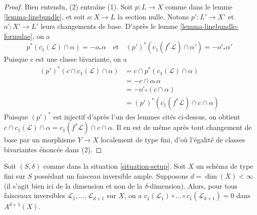 \begin{proof}
Bien entendu, (2) entraîne (1).
Soit $p : L \to X$ comme dans le lemme \ref{lemma-linebundle}, et soit $o : X \to L$
la section nulle. Notons $p' : L' \to X'$ et $o' : X' \to L'$
leurs changements de base. D'après le lemme \ref{lemma-linebundle-formulae}, on a
$$
p^*(c_1(\mathcal{L}) \cap \alpha) = - o_* \alpha
\quad\text{et}\quad
(p')^*(c_1(f^*\mathcal{L}) \cap \alpha') = - o'_* \alpha'
$$
Puisque $c$ est une classe bivariante, on a
\begin{align*}
(p')^*(c \cap c_1(\mathcal{L}) \cap \alpha)
& =
c \cap p^*(c_1(\mathcal{L}) \cap \alpha) \\
& =
- c \cap o_* \alpha \\
& =
- o'_*(c \cap \alpha) \\
& =
(p')^*(c_1(f^*\mathcal{L}) \cap c \cap \alpha)
\end{align*}
Puisque $(p')^*$ est injectif d'après l'un des lemmes cités ci-dessus, on obtient
$c \cap c_1(\mathcal{L}) \cap \alpha =
c_1(f^*\mathcal{L}) \cap c \cap \alpha$.
Il en est de même après tout changement de base par un morphisme $Y \to X$ localement de type fini,
d'où l'égalité de classes bivariantes énoncée dans (2).
\end{proof}

\begin{lemma}
\label{lemma-vanish-above-dimension}
Soit $(S, \delta)$ comme dans la situation \ref{situation-setup}. Soit $X$ un
schéma de type fini sur $S$ possédant un faisceau inversible ample.
Supposons $d = \dim(X) < \infty$ (il s'agit bien ici de la dimension et
non de la $\delta$-dimension).
Alors, pour tous faisceaux inversibles $\mathcal{L}_1, \ldots, \mathcal{L}_{d + 1}$
sur $X$, on a
$c_1(\mathcal{L}_1) \circ \ldots \circ c_1(\mathcal{L}_{d + 1}) = 0$
dans $A^{d + 1}(X)$.
\end{lemma}

